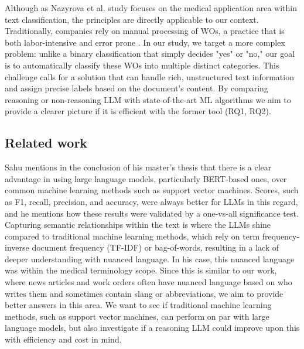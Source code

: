 Although as Nazyrova et al. \cite{nazyrova2024medical} study focuses on the medical application area within text classification, the principles are directly applicable to our context.  Traditionally, companies rely on manual processing of WOs, a practice that is both labor-intensive and error prone \cite{li2024work}. In our study, we target a more complex problem: unlike a binary classification that simply decides "yes" or "no," our goal is to automatically classify these WOs into multiple distinct categories. This challenge calls for a solution that can handle rich, unstructured text information and assign precise labels based on the document’s content. By comparing reasoning or non-reasoning LLM with state-of-the-art ML algorithms we aim to provide a clearer picture if it is efficient with the former tool (RQ1, RQ2).

\subsection{Related work}




Sahu \cite{sahu2025language} mentions in the conclusion of his master's thesis that there is a clear advantage in using large language models, particularly BERT-based ones, over common machine learning methods such as support vector machines. Scores, such as F1, recall, precision, and accuracy, were always better for LLMs in this regard, and he mentions how these results were validated by a one-vs-all significance test. Capturing semantic relationships within the text is where the LLMs shine compared to traditional machine learning methods, which rely on term frequency-inverse document frequency (TF-IDF) or bag-of-words, resulting in a lack of deeper understanding with nuanced language. In his case, this nuanced language was within the medical terminology scope. Since this is similar to our work, where news articles and work orders often have nuanced language based on who writes them and sometimes contain slang or abbreviations, we aim to provide better answers in this area. We want to see if traditional machine learning methods, such as support vector machines, can perform on par with large language models, but also investigate if a reasoning LLM could improve upon this with efficiency and cost in mind.

